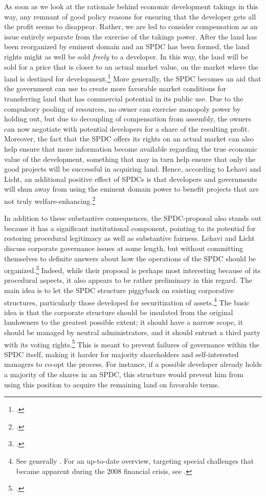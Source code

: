 As soon as we look at the rationale behind economic development takings in this way, any remnant of good policy reasons for ensuring that the developer gets all the profit seems to disappear. Rather, we are led to consider compensation as an issue entirely separate from the exercise of the takings power. After the land has been reorganized by eminent domain and an SPDC has been formed, the land rights might as well be sold {\it freely} to a developer. In this way, the land will be sold for a price that is closer to an actual market value, on the market where the land is destined for development.\footcite[1735-1736]{lehavi07} More generally, the SPDC becomes an aid that the government can use to create more favorable market conditions for transferring land that has commercial potential in its public use. Due to the compulsory pooling of resources, no owner can exercise monopoly power by holding out, but due to decoupling of compensation from assembly, the owners can now negotiate with potential developers for a share of the resulting profit. Moreover, the fact that the SPDC offers its rights on an actual market can also help ensure that more information become available regarding the true economic value of the development, something that may in turn help ensure that only the good projects will be successful in acquiring land. Hence, according to Lehavi and Licht, an additional positive effect of SPDCs is that developers and governments will shun away from using the eminent domain power to benefit projects that are not truly welfare-enhancing.\footcite[1735-1736]{lehavi07}

In addition to these substantive consequences, the SPDC-proposal also stands out because it has a significant institutional component, pointing to its potential for restoring procedural legitimacy as well as substantive fairness. Lehavi and Licht discuss corporate governance issues at some length, but without committing themselves to definite answers about how the operations of the SPDC should be organized.\footcite[1040-1048]{lehavi07} Indeed, while their proposal is perhaps most interesting because of its procedural aspects, it also appears to be rather preliminary in this regard. The main idea is to let the SPDC structure piggyback on existing corporative structures, particularly those developed for securitization of assets.\footnote{See generally \cite{schwarz94}. For an up-to-date overview, targeting special challenges that became apparent during the 2008 financial crisis, see \cite{schwarz13}.} The basic idea is that the corporate structure should be insulated from the original landowners to the greatest possible extent; it should have a narrow scope, it should be managed by neutral administrators, and it should entrust a third party with its voting rights.\footcite[1742]{legavi07} This is meant to prevent failures of governance within the SPDC itself, making it harder for majority shareholders and self-interested managers to co-opt the process. For instance, if a possible developer already holds a majority of the shares in an SPDC, this structure would prevent him from using this position to acquire the remaining land on favorable terms. 

